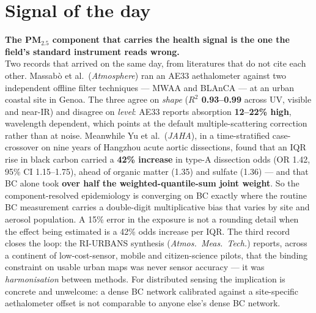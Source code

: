 \documentclass[10pt]{article}
\begin{document}
\vspace{6mm}

\section*{\sffamily\bfseries\color{Deep}Signal of the day}
\vspace{-1.5mm}{\color{Amber}\rule{\linewidth}{1.1pt}}\vspace{2.5mm}

\begin{keybox}
{\sffamily\bfseries\small\color{Deep}The PM$_{2.5}$ component that carries the health
signal is the one the field's standard instrument reads wrong.}\\[1.4mm]
\footnotesize
Two records that arrived on the same day, from literatures that do not cite each other.
Massabò et al.\ (\textit{Atmosphere}) ran an AE33 aethalometer against two independent
offline filter techniques --- MWAA and BLAnCA --- at an urban coastal site in Genoa. The
three agree on \emph{shape} (\textbf{$R^2$ 0.93--0.99} across UV, visible and near-IR) and
disagree on \emph{level}: AE33 reports absorption \textbf{12--22\% high}, wavelength
dependent, which points at the default multiple-scattering correction rather than at
noise. Meanwhile Yu et al.\ (\textit{JAHA}), in a time-stratified case-crossover on nine
years of Hangzhou acute aortic dissections, found that an IQR rise in black carbon carried
a \textbf{42\% increase} in type-A dissection odds (OR 1.42, 95\% CI 1.15--1.75), ahead of
organic matter (1.35) and sulfate (1.36) --- and that BC alone took
\textbf{over half the weighted-quantile-sum joint weight}. So the component-resolved
epidemiology is converging on BC exactly where the routine BC measurement carries a
double-digit multiplicative bias that varies by site and aerosol population. A 15\% error
in the exposure is not a rounding detail when the effect being estimated is a 42\% odds
increase per IQR. The third record closes the loop: the RI-URBANS synthesis
(\textit{Atmos.\ Meas.\ Tech.}) reports, across a continent of low-cost-sensor, mobile and
citizen-science pilots, that the binding constraint on usable urban maps was never sensor
accuracy --- it was \emph{harmonisation} between methods. For distributed sensing the
implication is concrete and unwelcome: a dense BC network calibrated against a
site-specific aethalometer offset is not comparable to anyone else's dense BC network.
\end{keybox}
\end{document}
